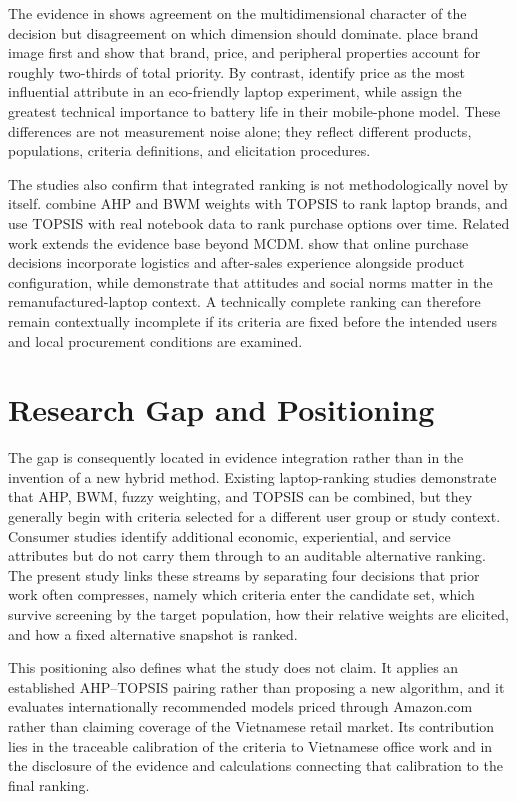 The evidence in  shows agreement on the multidimensional character of the
decision but disagreement on which dimension should dominate. \textcite{sonmez_cakir_determination_2020}
place brand image first and show that brand, price, and peripheral properties account for roughly
two-thirds of total priority. By contrast, \textcite{liao_determinants_2022} identify price as the
most influential attribute in an eco-friendly laptop experiment, while
\textcite{weng_siew_lam_evaluation_2023} assign the greatest technical importance to battery life
in their mobile-phone model. These differences are not measurement noise alone; they reflect
different products, populations, criteria definitions, and elicitation procedures.

The studies also confirm that integrated ranking is not methodologically novel by itself.
\textcite{gaur_application_2023} combine AHP and BWM weights with TOPSIS to rank laptop brands, and
\textcite{rau_optimal_2018} use TOPSIS with real notebook data to rank purchase options over time.
Related work extends the evidence base beyond MCDM. \textcite{kang_study_2022} show that online
purchase decisions incorporate logistics and after-sales experience alongside product
configuration, while \textcite{jimenez-parra_key_2014} demonstrate that attitudes and social norms
matter in the remanufactured-laptop context. A technically complete ranking can therefore remain
contextually incomplete if its criteria are fixed before the intended users and local procurement
conditions are examined.

\section{Research Gap and Positioning}\label{sec:gap}

The gap is consequently located in evidence integration rather than in the invention of a new
hybrid method. Existing laptop-ranking studies demonstrate that AHP, BWM, fuzzy weighting, and
TOPSIS can be combined, but they generally begin with criteria selected for a different user group
or study context. Consumer studies identify additional economic, experiential, and service
attributes but do not carry them through to an auditable alternative ranking. The present study
links these streams by separating four decisions that prior work often compresses, namely which
criteria enter the candidate set, which survive screening by the target population, how their
relative weights are elicited, and how a fixed alternative snapshot is ranked.

This positioning also defines what the study does not claim. It applies an established AHP--TOPSIS
pairing rather than proposing a new algorithm, and it evaluates internationally recommended models
priced through Amazon.com rather than claiming coverage of the Vietnamese retail market. Its
contribution lies in the traceable calibration of the criteria to Vietnamese office work and in
the disclosure of the evidence and calculations connecting that calibration to the final ranking.
